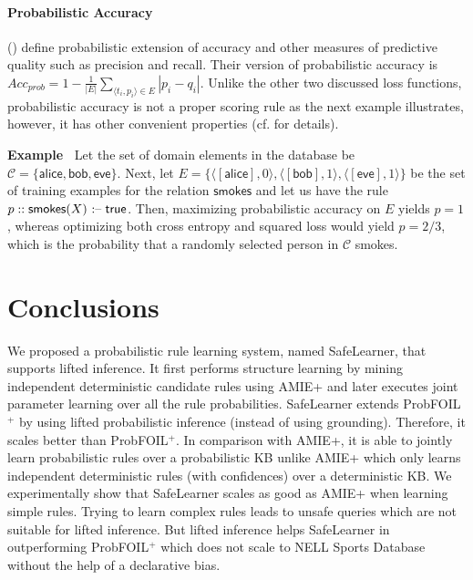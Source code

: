 \documentclass[akbc,twoside,11pt]{article}
\newcounter{example}
\newenvironment{example}[1][]{\refstepcounter{example}\par\medskip\noindent
   \textbf{Example~\theexample #1} \rmfamily}{\medskip}
\newcommand{\algorithmname}{SafeLearner\xspace}
\begin{document}
\paragraph{Probabilistic Accuracy}

\citeauthor{DBLP:conf/ijcai/RaedtDTBV15} (\citeyear{DBLP:conf/ijcai/RaedtDTBV15}) define probabilistic extension of accuracy and other measures of predictive quality such as precision and recall. Their version of probabilistic accuracy is
$\textit{Acc}_{\textit{prob}} = 1-\frac{1}{|E|} \sum_{\langle t_i, p_i \rangle \in E} \left| p_i - q_i \right|.$
Unlike the other two discussed loss functions, probabilistic accuracy is not a proper scoring rule as the next example illustrates, however, it has other convenient properties (cf. \citet{DBLP:conf/ijcai/RaedtDTBV15} for details). 
\begin{example}
Let the set of domain elements in the database be $\mathcal{C} = \{\mathsf{alice}, \mathsf{bob}, \mathsf{eve} \}$. Next, let $E = \{ \langle [\mathsf{alice}], 0 \rangle, \langle [\mathsf{bob}], 1 \rangle, \langle [\mathsf{eve}], 1 \rangle \}$ be the set of training examples for the relation $\mathsf{smokes}$ and let us have the rule $p :: \mathsf{smokes}(X) \mbox{ \textnormal{:--}}\; \mathsf{true}$. Then, maximizing probabilistic accuracy on $E$ yields $p = 1$, whereas optimizing both cross entropy and squared loss would yield $p = 2/3$, which is the probability that a randomly selected person in $\mathcal{C}$ smokes.
\end{example}

\section{Conclusions}
\label{sec:conc}
We proposed a probabilistic rule learning system, named \algorithmname, that supports lifted inference. It first performs structure learning by mining independent deterministic candidate rules using AMIE+ and later executes joint parameter learning over all the rule probabilities.
\algorithmname extends ProbFOIL$^+$ by using lifted probabilistic inference (instead of using grounding). 
Therefore, it scales better than ProbFOIL$^+$. In comparison with AMIE+, it is able to jointly learn probabilistic rules over a probabilistic KB unlike AMIE+ which only learns independent deterministic rules (with confidences) over a deterministic KB. We experimentally show that \algorithmname scales as good as AMIE+ when learning simple rules. Trying to learn complex rules leads to unsafe queries which are not suitable for lifted inference. But lifted inference helps \algorithmname in outperforming ProbFOIL$^+$ which does not scale to NELL Sports Database without the help of a declarative bias. 
\end{document}
